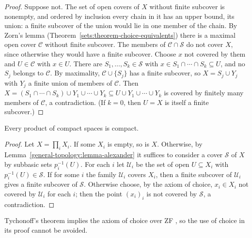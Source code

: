 \begin{proof}
Suppose not. The set of open covers of $X$ without finite subcover is nonempty, and ordered by inclusion every chain in it has an upper bound, its
union: a finite subcover of the union would lie in one member of the chain. By Zorn's lemma (Theorem~\ref{sets:theorem-choice-equivalents}) there is a
maximal open cover $\mathcal{C}$ without finite subcover. The members of $\mathcal{C} \cap \mathcal{S}$ do not cover $X$, since otherwise they would have
a finite subcover. Choose $x$ not covered by them and $U \in \mathcal{C}$ with $x \in U$. There are $S_1, \ldots, S_k \in \mathcal{S}$ with
$x \in S_1 \cap \cdots \cap S_k \subseteq U$, and no $S_j$ belongs to $\mathcal{C}$. By maximality, $\mathcal{C} \cup \{S_j\}$ has a finite subcover, so
$X = S_j \cup Y_j$ with $Y_j$ a finite union of members of $\mathcal{C}$. Then $X = (S_1 \cap \cdots \cap S_k) \cup Y_1 \cup \cdots \cup Y_k \subseteq U \cup Y_1 \cup \cdots \cup Y_k$
is covered by finitely many members of $\mathcal{C}$, a contradiction. (If $k = 0$, then $U = X$ is itself a finite subcover.)
\end{proof}

\begin{theorem}[Tychonoff]\label{general-topology:theorem-tychonoff}
Every product of compact spaces is compact.
\end{theorem}

\begin{proof}
Let $X = \prod_i X_i$. If some $X_i$ is empty, so is $X$. Otherwise, by Lemma~\ref{general-topology:lemma-alexander} it suffices to consider a cover
$\mathcal{S}$ of $X$ by subbasic sets $p_i^{-1}(U)$. For each $i$ let $\mathcal{U}_i$ be the set of open $U \subseteq X_i$ with $p_i^{-1}(U) \in \mathcal{S}$.
If for some $i$ the family $\mathcal{U}_i$ covers $X_i$, then a finite subcover of $\mathcal{U}_i$ gives a finite subcover of $\mathcal{S}$. Otherwise choose,
by the axiom of choice, $x_i \in X_i$ not covered by $\mathcal{U}_i$ for each $i$; then the point $(x_i)_i$ is not covered by $\mathcal{S}$, a contradiction.
\end{proof}

\begin{remark}\label{general-topology:remark-tychonoff-choice}
Tychonoff's theorem implies the axiom of choice over ZF \cite{kelley-1950}, so the use of choice in its proof cannot be avoided.
\end{remark}

